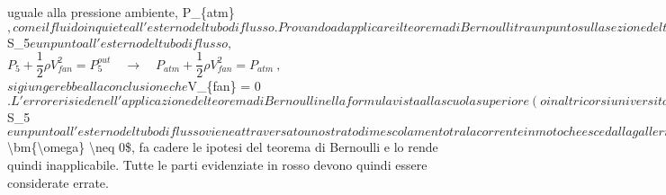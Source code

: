 \documentclass[letterpaper,10pt,italian]{jupyterBook}
\begin{document}
uguale alla pressione ambiente, \)P\_\{atm\}\(, come il fluido in quiete
all'esterno del tubo di flusso. Provando ad applicare il teorema di
Bernoulli tra un punto sulla sezione del tubo di flusso \)S\_5\( e un punto
all'esterno del tubo di flusso,
\)\(P_5 + \dfrac{1}{2}\rho V_{fan}^2 = P_5^{out}
 \quad \rightarrow \quad 
 P_{atm} + \dfrac{1}{2}\rho V_{fan}^2 = P_{atm} \ ,\)\( si giungerebbe
alla conclusione che \)V\_\{fan\} = 0\(. L'errore risiede nell'applicazione
del teorema di Bernoulli nella formula vista alla scuola superiore (o in
altri corsi universitari), nonostante alcune ipotesi (che verranno
presentate nel prosieguo del corso) non siano rispettate. In
particolare, per collegare un punto sulla sezione \)S\_5\( e un punto
all'esterno del tubo di flusso viene attraversato uno strato di
mescolamento tra la corrente in moto che esce dalla galleria e il fluido
in quiete all'esterno: la presenza di questo strato di mescolamento, nel
quale la corrente non è irrotazionale \)\textbackslash{}bm\{\textbackslash{}omega\} \textbackslash{}neq 0\$, fa cadere le
ipotesi del teorema di Bernoulli e lo rende quindi inapplicabile. Tutte
le parti evidenziate in rosso devono quindi essere considerate errate.

\sphinxstepscope
\end{document}
